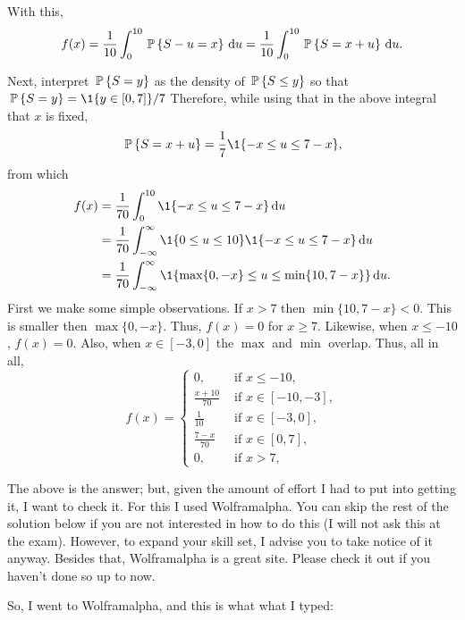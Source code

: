 \begin{question}
\begin{solution}
With this,
\begin{equation*}
  f(x) 
= \frac1{10}\int_{0}^{10} \P{S-u=  x }\d u 
= \frac1{10}\int_{0}^{10} \P{S= x +u} \d u.
\end{equation*}

Next, interpret $\P{S= y}$ as the density of $\P{S\leq y}$ so that
$\P{S= y} = \1{y\in [0,7]}/7$ Therefore, while using that in the above
integral that $x$ is fixed,
\begin{equation*}
  \P{S= x+u} = \frac 17 \1{-x \leq u \leq 7-x},
\end{equation*}
from which
\begin{equation*}
  \begin{split}
  f(x)  
&= \frac1{70}\int_{0}^{10} \1{-x \leq u \leq 7-x} \d u \\
&= \frac1{70}\int_{-\infty}^{\infty} \1{0\leq u \leq 10} \1{-x \leq u \leq 7-x} \d u \\
&= \frac1{70}\int_{-\infty}^{\infty} \1{\max\{0, -x\} \leq u \leq \min\{10, 7-x\}} \d u.\\
  \end{split}
\end{equation*}
First we make some simple observations. If $x>7$ then
$\min\{10, 7-x\} <0$. This is smaller then $\max\{0, -x\}$. Thus,
$f(x) = 0$ for $x\geq 7$. Likewise, when $x\leq -10$, $f(x) =
0$. Also, when $x\in[-3,0]$ the $\max$ and $\min$ overlap. Thus, all in all,
\begin{equation*}
  f(x) = 
  \begin{cases}
    0, &\text{ if } x\leq -10, \\
 \frac {x+10}{70} &\text{ if } x \in [-10, -3], \\
\frac 1{10} &\text{ if } x \in [-3, 0], \\
 \frac {7-x}{70} &\text{ if } x \in [0, 7], \\
    0, &\text{ if } x>7, 
  \end{cases}
\end{equation*}

The above is the answer; but, given the amount of effort I had to put
into getting it, I want to check it. For this I used Wolframalpha. You
can skip the rest of the solution below if you are not interested in how to
do this (I will not ask this at the exam). However, to expand your
skill set, I advise you to take notice of it anyway. Besides that, 
Wolframalpha is a great site. Please check it out if you haven't done
so up to now.

So, I went to Wolframalpha, and this is what what I typed: 


\end{solution}
\end{question}
